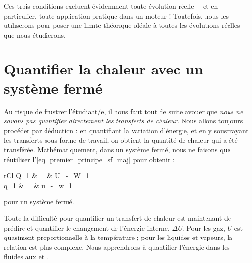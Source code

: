 		Ces trois conditions excluent évidemment toute évolution réelle --\ et en particulier, toute application pratique dans un moteur ! Toutefois, nous les utiliserons pour poser une limite théorique idéale à toutes les évolutions réelles que nous étudierons.



\section[Quantifier la chaleur avec un système fermé]{Quantifier la chaleur avec un système\onlyamphibook{\\} fermé}

		Au risque de frustrer l’étudiant/e, il nous faut tout de suite avouer que \emph{nous ne savons pas quantifier directement les transferts de chaleur}. Nous allons toujours procéder par déduction : en quantifiant la variation d’énergie, et en y soustrayant les transferts sous forme de travail, on obtient la quantité de chaleur qui a été transférée. Mathématiquement, dans un système fermé, nous ne faisons que réutiliser l’\cref{eq_premier_principe_sf_maj} pour obtenir :
	\begin{IEEEeqnarray}{rCl}
		Q_{1 } 	& = & 	\Delta U \ - \  W_{1 } \\
		q_{1 } 	& = & 	\Delta u \ - \  w_{1 }
	\end{IEEEeqnarray}
	\begin{equationterms}
		\item pour un système fermé.
	\end{equationterms}
		
		Toute la difficulté pour quantifier un transfert de chaleur est maintenant de prédire et quantifier le changement de l’énergie interne, $\Delta U$. Pour les gaz, $U$ est quasiment proportionnelle à la température ; pour les liquides et vapeurs, la relation est plus complexe. Nous apprendrons à quantifier l’énergie dans les fluides aux \coursquatre et \courscinq.
